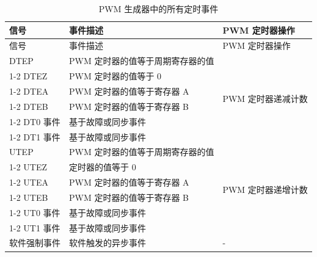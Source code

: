 \begin{longtable}{ |p{3cm}|p{7cm}|p{5cm}|}
    \caption{ PWM 生成器中的所有定时事件}
    \label{table:gen_in}
    \\\hline
    \rowcolor{lightgray}
   信号 & 事件描述 & PWM 定时器操作 \\\hline
    \endfirsthead
    \hline
    \rowcolor{lightgray}   
    信号 & 事件描述 & PWM 定时器操作 \\\hline
    \endhead
    \hline
    \endfoot
    DTEP 
    & PWM 定时器的值等于周期寄存器的值
    & \multirow{6}{*}{PWM 定时器递减计数}
    \\
    \cline{1-2}
    DTEZ
    & PWM 定时器的值等于 0
    & 
    \\
    \cline{1-2}
    DTEA
    & PWM 定时器的值等于寄存器 A
    & 
    \\
    \cline{1-2}
    DTEB
    & PWM 定时器的值等于寄存器 B
    & 
    \\
    \cline{1-2}
    DT0 事件
    & 基于故障或同步事件
    & 
    \\
    \cline{1-2}
    DT1 事件
    & 基于故障或同步事件
    & 
    \\\hline
    UTEP
    & PWM 定时器的值等于周期寄存器的值
    & \multirow{6}{*}{PWM 定时器递增计数}
    \\
    \cline{1-2}
    UTEZ
    & 定时器的值等于 0
    & 
    \\
    \cline{1-2}
    UTEA
    & PWM 定时器的值等于寄存器 A
    & 
    \\
    \cline{1-2}
    UTEB
    & PWM 定时器的值等于寄存器 B
    & 
    \\
    \cline{1-2}
    UT0 事件
    & 基于故障或同步事件
    & 
    \\
    \cline{1-2}
    UT1 事件
    & 基于故障或同步事件
    & 
    \\\hline
    软件强制事件
    & 软件触发的异步事件
    & -
\end{longtable}